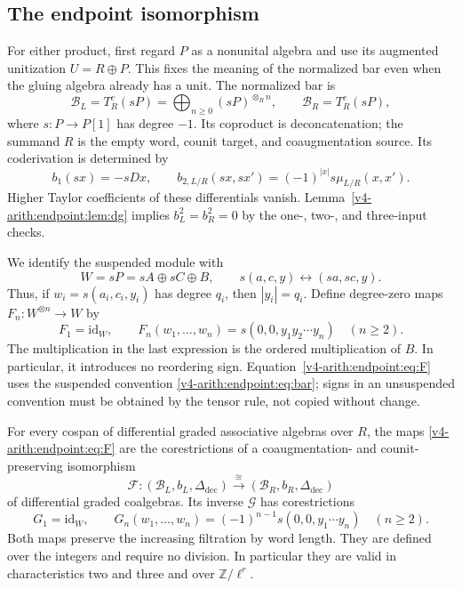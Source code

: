 \subsection{The endpoint isomorphism}
For either product, first regard $P$ as a nonunital algebra and use its augmented unitization $U=R\oplus P$. This fixes the meaning of the normalized bar even when the gluing algebra already has a unit. The normalized bar is
\[
 \mathcal{B}_L=T^c_R(sP)=\bigoplus_{n\geq0}(sP)^{\otimes_R n},
 \qquad \mathcal{B}_R=T^c_R(sP),
\]
where $s:P\to P[1]$ has degree $-1$. Its coproduct is deconcatenation; the summand $R$ is the empty word, counit target, and coaugmentation source. Its coderivation is determined by
\begin{equation}\label{v4-arith:endpoint:eq:bar}
 b_1(sx)=-sDx,\qquad
 b_{2,L/R}(sx,sx')=(-1)^{|x|}s\mu_{L/R}(x,x').
\end{equation}
Higher Taylor coefficients of these differentials vanish. Lemma~\ref{v4-arith:endpoint:lem:dg} implies $b_L^2=b_R^2=0$ by the one-, two-, and three-input checks.

We identify the suspended module with
\[
 W=sP=sA\oplus sC\oplus B,
 \qquad s(a,c,y)\longleftrightarrow(sa,sc,y).
\]
Thus, if $w_i=s(a_i,c_i,y_i)$ has degree $q_i$, then $|y_i|=q_i$. Define degree-zero maps $F_n:W^{\otimes n}\to W$ by
\begin{equation}\label{v4-arith:endpoint:eq:F}
 F_1=\mathrm{id}_W,\qquad
 F_n(w_1,\ldots,w_n)=s(0,0,y_1y_2\cdots y_n)\quad(n\geq2).
\end{equation}
The multiplication in the last expression is the ordered multiplication of $B$. In particular, it introduces no reordering sign. Equation~\eqref{v4-arith:endpoint:eq:F} uses the suspended convention \eqref{v4-arith:endpoint:eq:bar}; signs in an unsuspended convention must be obtained by the tensor rule, not copied without change.

\begin{theorem}\label{v4-arith:endpoint:thm:main}
For every cospan of differential graded associative algebras over $R$, the maps \eqref{v4-arith:endpoint:eq:F} are the corestrictions of a coaugmentation- and counit-preserving isomorphism
\[
 \mathcal{F}:(\mathcal{B}_L,b_L,\Delta_{\mathrm{dec}})
       \xrightarrow{\ \cong\ }
       (\mathcal{B}_R,b_R,\Delta_{\mathrm{dec}})
\]
of differential graded coalgebras. Its inverse $\mathcal{G}$ has corestrictions
\begin{equation}\label{v4-arith:endpoint:eq:G}
 G_1=\mathrm{id}_W,\qquad
 G_n(w_1,\ldots,w_n)=(-1)^{n-1}s(0,0,y_1\cdots y_n)
 \quad(n\geq2).
\end{equation}
Both maps preserve the increasing filtration by word length. They are defined over the integers and require no division. In particular they are valid in characteristics two and three and over $\mathbb Z/\ell^r$.
\end{theorem}

